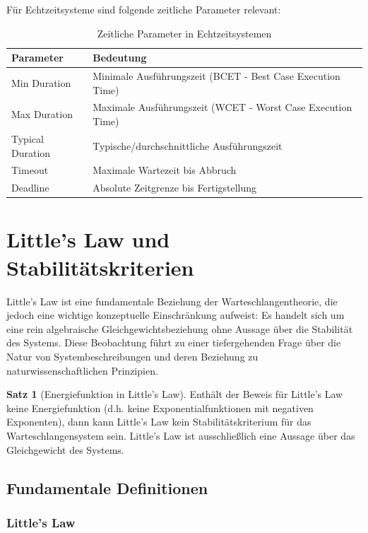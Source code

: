 ﻿\documentclass[a4paper,12pt]{scrreprt}
\theoremstyle{definition}
\newtheorem{satz}{Satz}[section]
\begin{document}
Für Echtzeitsysteme sind folgende zeitliche Parameter relevant:

\begin{table}[H]
	\centering
	\begin{tabular}{@{}lp{8cm}@{}}
		\toprule
		\textbf{Parameter} & \textbf{Bedeutung} \\
		\midrule
		Min Duration & Minimale Ausführungszeit (BCET - Best Case Execution Time) \\
		Max Duration & Maximale Ausführungszeit (WCET - Worst Case Execution Time) \\
		Typical Duration & Typische/durchschnittliche Ausführungszeit \\
		Timeout & Maximale Wartezeit bis Abbruch \\
		Deadline & Absolute Zeitgrenze bis Fertigstellung \\
		\bottomrule
	\end{tabular}
	\caption{Zeitliche Parameter in Echtzeitsystemen}
	\label{tab:timing-params}
\end{table}

\section{Little's Law und Stabilitätskriterien}

Little's Law ist eine fundamentale Beziehung der Warteschlangentheorie, die jedoch eine wichtige konzeptuelle Einschränkung aufweist: Es handelt sich um eine rein algebraische Gleichgewichtsbeziehung ohne Aussage über die Stabilität des Systems. Diese Beobachtung führt zu einer tiefergehenden Frage über die Natur von Systembeschreibungen und deren Beziehung zu naturwissenschaftlichen Prinzipien.

\begin{satz}[Energiefunktion in Little's Law]
	Enthält der Beweis für Little's Law keine Energiefunktion (d.h. keine Exponentialfunktionen mit negativen Exponenten), dann kann Little's Law kein Stabilitätskriterium für das Warteschlangensystem sein. Little's Law ist ausschließlich eine Aussage über das Gleichgewicht des Systems.
\end{satz}

\subsection{Fundamentale Definitionen}

\subsubsection{Little's Law}
\end{document}
